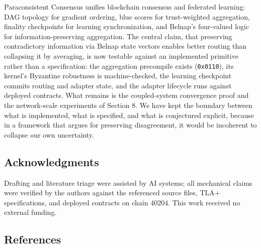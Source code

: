 Paraconsistent Consensus unifies blockchain consensus and federated
learning: DAG topology for gradient ordering, blue scores for
trust-weighted aggregation, finality checkpoints for learning
synchronization, and Belnap's four-valued logic for
information-preserving aggregation. The central claim, that preserving
contradictory information via Belnap state vectors enables better
routing than collapsing it by averaging, is now testable against an
implemented primitive rather than a specification: the aggregation
precompile exists (\texttt{0x0110}), its kernel's Byzantine robustness
is machine-checked, the learning checkpoint commits routing and adapter
state, and the adapter lifecycle runs against deployed contracts. What
remains is the coupled-system convergence proof and the network-scale
experiments of Section 8. We have kept the boundary between what is
implemented, what is specified, and what is conjectured explicit,
because in a framework that argues for preserving disagreement, it would
be incoherent to collapse our own uncertainty.

\subsection{Acknowledgments}\label{acknowledgments}

Drafting and literature triage were assisted by AI systems; all
mechanical claims were verified by the authors against the referenced
source files, TLA+ specifications, and deployed contracts on chain
40204. This work received no external funding.

\subsection{References}\label{references}

